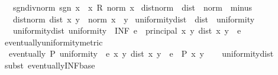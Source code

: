 \begin{isabellebody}
\ \ \ sgn{\isacharunderscore}{\kern0pt}div{\isacharunderscore}{\kern0pt}norm{\isacharcolon}{\kern0pt}\ {\isachardoublequoteopen}sgn\ x\ {\isacharequal}{\kern0pt}\ x\ {\isacharslash}{\kern0pt}\isactrlsub R\ norm\ x{\isachardoublequoteclose}\isanewline
\isanewline
{}\isamarkupfalse%
\ dist{\isacharunderscore}{\kern0pt}norm\ {\isacharequal}{\kern0pt}\ dist\ {\isacharplus}{\kern0pt}\ norm\ {\isacharplus}{\kern0pt}\ minus\ {\isacharplus}{\kern0pt}\isanewline
\ \ \ dist{\isacharunderscore}{\kern0pt}norm{\isacharcolon}{\kern0pt}\ {\isachardoublequoteopen}dist\ x\ y\ {\isacharequal}{\kern0pt}\ norm\ {\isacharparenleft}{\kern0pt}x\ {\isacharminus}{\kern0pt}\ y{\isacharparenright}{\kern0pt}{\isachardoublequoteclose}\isanewline
\isanewline
{}\isamarkupfalse%
\ uniformity{\isacharunderscore}{\kern0pt}dist\ {\isacharequal}{\kern0pt}\ dist\ {\isacharplus}{\kern0pt}\ uniformity\ {\isacharplus}{\kern0pt}\isanewline
\ \ \ uniformity{\isacharunderscore}{\kern0pt}dist{\isacharcolon}{\kern0pt}\ {\isachardoublequoteopen}uniformity\ {\isacharequal}{\kern0pt}\ {\isacharparenleft}{\kern0pt}INF\ e{\isasymin}{\isacharbraceleft}{\kern0pt}{}\ {\isacharless}{\kern0pt}{\isachardot}{\kern0pt}{\isachardot}{\kern0pt}{\isacharbraceright}{\kern0pt}{\isachardot}{\kern0pt}\ principal\ {\isacharbraceleft}{\kern0pt}{\isacharparenleft}{\kern0pt}x{\isacharcomma}{\kern0pt}\ y{\isacharparenright}{\kern0pt}{\isachardot}{\kern0pt}\ dist\ x\ y\ {\isacharless}{\kern0pt}\ e{\isacharbraceright}{\kern0pt}{\isacharparenright}{\kern0pt}{\isachardoublequoteclose}\isanewline
{}\isanewline
\isanewline
{}\isamarkupfalse%
\ eventually{\isacharunderscore}{\kern0pt}uniformity{\isacharunderscore}{\kern0pt}metric{\isacharcolon}{\kern0pt}\isanewline
\ \ {\isachardoublequoteopen}eventually\ P\ uniformity\ {\isasymlongleftrightarrow}\ {\isacharparenleft}{\kern0pt}{\isasymexists}e{\isachargreater}{\kern0pt}{}{\isachardot}{\kern0pt}\ {\isasymforall}x\ y{\isachardot}{\kern0pt}\ dist\ x\ y\ {\isacharless}{\kern0pt}\ e\ {\isasymlongrightarrow}\ P\ {\isacharparenleft}{\kern0pt}x{\isacharcomma}{\kern0pt}\ y{\isacharparenright}{\kern0pt}{\isacharparenright}{\kern0pt}{\isachardoublequoteclose}\isanewline
%
\isadelimproof
\ \ %
\endisadelimproof
%
\isatagproof
{}\isamarkupfalse%
\ uniformity{\isacharunderscore}{\kern0pt}dist\isanewline
\ \ \isamarkupfalse%
\ {\isacharparenleft}{\kern0pt}subst\ eventually{\isacharunderscore}{\kern0pt}INF{\isacharunderscore}{\kern0pt}base{\isacharparenright}{\kern0pt}\isanewline

\end{isabellebody}
